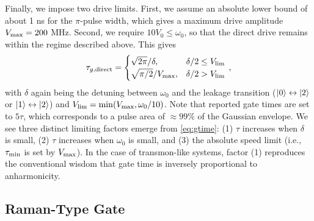 Finally, we impose two drive limits. First, we assume an absolute lower bound of about 1 ns for the $\pi$-pulse width, which gives a maximum drive amplitude $V_{\rm max} = 200$ MHz. Second, we require $10 V_0 \leq \omega_0$, so that the direct drive remains within the regime described above. This gives
\begin{align}\label{eq:gtime}
\tau_{g,\textrm{direct}} =
    \begin{cases} 
      \sqrt{2\pi}/\delta, & \delta/2 \leq V_{\rm lim}\\
      \sqrt{\pi/2}/V_{\rm max} ,& \delta/2 > V_{\rm lim}
   \end{cases} \, ,
\end{align}
with $\delta$ again being the detuning between $\omega_0$ and the leakage transition ($\ket{0}\leftrightarrow\ket{2}$ or $\ket{1}\leftrightarrow\ket{2}$) and $V_{\rm lim} = \min(V_{\rm max}, \omega_0/10)$. Note that reported gate times are set to $5 \tau$, which corresponds to a pulse area of $\approx 99 \%$ of the Gaussian envelope. We see three distinct limiting factors emerge from \cref{eq:gtime}: (1) $\tau$ increases when $\delta$ is small, (2) $\tau$ increases when $\omega_0$ is small, and (3) the absolute speed limit (i.e., $\tau_{\rm min}$ is set by $V_{\rm max}$). In the case of transmon-like systems, factor (1) reproduces the conventional wisdom that gate time is inversely proportional to anharmonicity.

\subsection{Raman-Type Gate}

